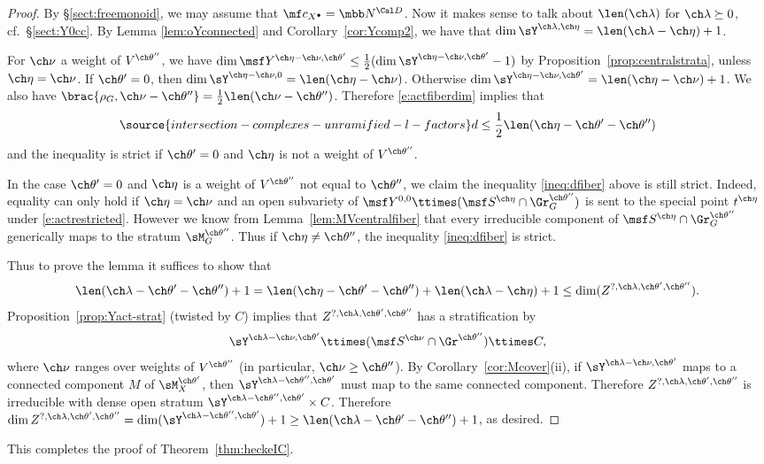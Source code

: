 \begin{proof}
By \S\ref{sect:freemonoid}, we may assume that $\mf c_{X^\bullet} = \mbb N^{\Cal D}$.
Now it makes sense to talk about $\len(\ch\lambda)$ for $\ch\lambda \succeq 0$, cf.~\S\ref{sect:Y0cc}.
By Lemma \ref{lem:oYconnected} and Corollary~\ref{cor:Ycomp2},
we have that $\dim \sY^{\ch\lambda,\ch\eta} = \len(\ch\lambda-\ch\eta)+1$.

For $\ch\nu$ a weight of $V^{\ch\theta''}$, we have
$\dim \msf Y^{\ch\eta-\ch\nu,\ch\theta'} \le \frac 1 2(\dim \sY^{\ch\eta-\ch\nu,\ch\theta'}-1)$
by Proposition~\ref{prop:centralstrata}, unless $\ch\eta=\ch\nu$.
If $\ch\theta'=0$, then $\dim \sY^{\ch\eta-\ch\nu,0} = \len(\ch\eta-\ch\nu)$.
Otherwise $\dim \sY^{\ch\eta-\ch\nu,\ch\theta'} = \len(\ch\eta-\ch\nu)+1$.
We also have $\brac{\rho_G,\ch\nu-\ch\theta''} = \frac 1 2 \len(\ch\nu-\ch\theta'')$.
Therefore \eqref{e:actfiberdim} implies that
\begin{equation} \label{ineq:dfiber}
\source{intersection-complexes-unramified-l-factors}
 d \le \frac 1 2 \len(\ch\eta-\ch\theta'-\ch\theta'')
\end{equation}
and the inequality is strict if $\ch\theta' = 0$ and $\ch\eta$ is not a weight of $V^{\ch\theta''}$.

In the case $\ch\theta'=0$ and $\ch\eta$ is a weight of $V^{\ch\theta''}$ not equal to
$\ch\theta''$, we claim the inequality \eqref{ineq:dfiber} above is still strict.
Indeed, equality can only hold if $\ch\eta=\ch\nu$ and an open subvariety of
$\msf Y^{0,0} \ttimes (\msf S^{\ch\eta}\cap \Gr^{\ch\theta''}_G)$ is sent to
the special point $t^{\ch\eta}$ under \eqref{e:actrestricted}.
However we know from Lemma~\ref{lem:MVcentralfiber} that every irreducible
component of $\msf S^{\ch\eta}\cap \Gr^{\ch\theta''}_G$ generically maps to
the stratum $\sM^{\ch\theta''}_G$. Thus if $\ch\eta \ne \ch\theta''$,
the inequality \eqref{ineq:dfiber} is strict.


Thus to prove the lemma it suffices to show that
\[
 \len(\ch\lambda-\ch\theta'-\ch\theta'')+1 = \len(\ch\eta-\ch\theta'-\ch\theta'') + \len(\ch\lambda-\ch\eta) + 1 \le
\dim (Z^{?,\ch\lambda,\ch\theta',\ch\theta''}).
\]
Proposition~\ref{prop:Yact-strat} (twisted by $C$) implies that
$Z^{?,\ch\lambda,\ch\theta',\ch\theta''}$ has a stratification by
\[ \sY^{\ch\lambda-\ch\nu, \ch\theta'} \ttimes (\msf S^{\ch\nu}\cap \Gr^{\ch\theta''}) \ttimes C,\]
where $\ch\nu$ ranges over weights of $V^{\ch\theta''}$ (in particular, $\ch\nu\ge \ch\theta''$).
By Corollary~\ref{cor:Mcover}(ii), if
$\sY^{\ch\lambda-\ch\nu,\ch\theta'}$ maps to a connected component $M$ of
$\sM^{\ch\theta'}_X$, then $\sY^{\ch\lambda-\ch\theta'', \ch\theta'}$ must map to the
same connected component.
Therefore $Z^{?,\ch\lambda,\ch\theta',\ch\theta''}$ is irreducible with
dense open stratum
$\sY^{\ch\lambda-\ch\theta'',\ch\theta'} \times C$.
Therefore
$\dim Z^{?,\ch\lambda,\ch\theta',\ch\theta''} = \dim(\sY^{\ch\lambda-\ch\theta'',\ch\theta'})+1
\ge \len(\ch\lambda-\ch\theta'-\ch\theta'') + 1$, as desired.
\end{proof}

This completes the proof of Theorem~\ref{thm:heckeIC}.
